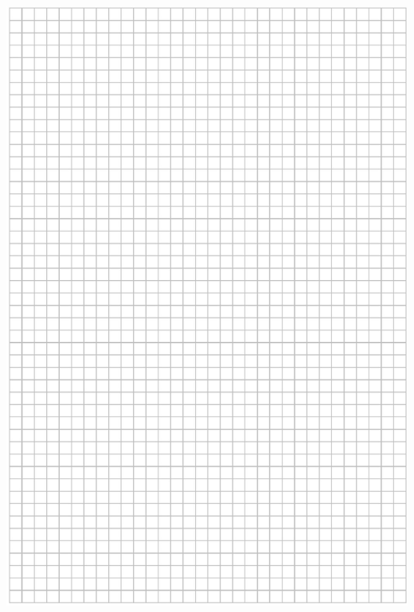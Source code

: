 \documentclass[10pt]{article}
\begin{document}
\includegraphics[max width=\textwidth, center]{2024_11_21_46d945490f1b2eff1c8eg-25}
\end{document}
